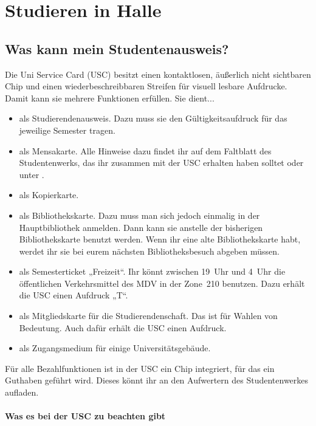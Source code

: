
\section{Studieren in Halle}

\subsection{Was kann mein Studentenausweis?}
Die Uni Service Card (USC) besitzt einen kontaktlosen, äußerlich nicht sichtbaren Chip und einen wiederbeschreibbaren Streifen für visuell lesbare Aufdrucke.
Damit kann sie mehrere Funktionen erfüllen. Sie dient...

\begin{itemize}
 \item als Studierendenausweis.
       Dazu muss sie den Gültigkeitsaufdruck für das jeweilige Semester tragen.
 \item als Mensakarte.
       Alle Hinweise dazu findet ihr auf dem Faltblatt des Studentenwerks, das ihr zusammen mit der USC erhalten haben solltet
       oder unter .
 \item als Kopierkarte.
 \item als Bibliothekskarte.
       Dazu muss man sich jedoch einmalig in der Hauptbibliothek anmelden.
       Dann kann sie anstelle der bisherigen Bibliothekskarte benutzt werden.
       Wenn ihr eine alte Bibliothekskarte habt, werdet ihr sie bei eurem nächsten Bibliotheksbesuch abgeben müssen.
 \item als Semesterticket „Freizeit“.
       Ihr könnt zwischen 19~Uhr und 4~Uhr die öffentlichen Verkehrsmittel des MDV in der Zone~210 benutzen.
       Dazu erhält die USC einen Aufdruck „T“.
 \item als Mitgliedskarte für die Studierendenschaft.
       Das ist für Wahlen von Bedeutung.
       Auch dafür erhält die USC einen Aufdruck.
 \item als Zugangsmedium für einige Universitätsgebäude.
\end{itemize}

Für alle Bezahlfunktionen ist in der USC ein Chip integriert, für das ein Guthaben geführt wird.
Dieses könnt ihr an den Aufwertern des Studentenwerkes aufladen.

\clearpage %

\paragraph{Was es bei der USC zu beachten gibt}

